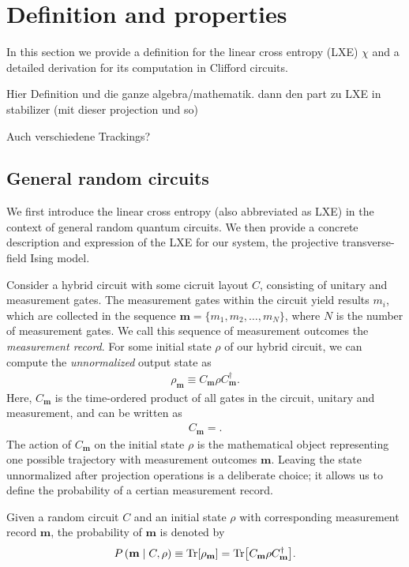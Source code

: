 \section{Definition and properties}\label{sec:lxe-defn}
In this section we provide a definition for the linear cross entropy (LXE)
$\chi$ and a detailed derivation for its computation in Clifford circuits.

Hier Definition und die ganze algebra/mathematik. dann den part zu LXE in
stabilizer (mit dieser projection und so)

Auch verschiedene Trackings?

\subsection{General random circuits}
We first introduce the linear cross entropy (also abbreviated as LXE) in the
context of general random quantum circuits. We then provide a concrete
description and expression of the LXE for our system, the projective
transverse-field Ising model.

Consider a hybrid circuit with some cicruit layout $C$, consisting of unitary
and measurement gates. The measurement gates within the circuit yield results
$m_i$, which are collected in the sequence $\mathbf{m} = \{m_1, m_2, \ldots,
m_N\}$, where $N$ is the number of measurement gates. We call this sequence of
measurement outcomes the \emph{measurement record}. For some initial state
$\rho$ of our hybrid circuit, we can compute the \emph{unnormalized} output
state as
\begin{align}\label{eq:rho-m}
  \rho_\mathbf{m} \equiv C_\mathbf{m} \rho C^\dagger_\mathbf{m}
.\end{align}
Here, $C_\mathbf{m}$ is the time-ordered product of all gates in the circuit,
unitary and measurement, and can be written as
\begin{align}
  C_\mathbf{m} = 
.\end{align}
The action of $C_\mathbf{m}$ on the initial state
$\rho$ is the mathematical object representing one possible trajectory with
measurement outcomes $\mathbf{m}$. Leaving the state unnormalized after 
projection operations is a deliberate choice; it allows us to define the
probability of a certian measurement record.

\begin{defn}\label{defn:prob-traj}
  Given a random circuit $C$ and an initial state $\rho$ with corresponding
  measurement record $\mathbf{m}$, the probability of $\mathbf{m}$ is denoted
  by
  \begin{align}\label{eq:prob-traj-defn}
    P\left( \mathbf{m} \mid C, \rho \right) \equiv \Tr[\rho_\mathbf{m}] =
    \Tr[C_\mathbf{m} \rho C^\dagger_\mathbf{m}]
  .\end{align}
\end{defn}

